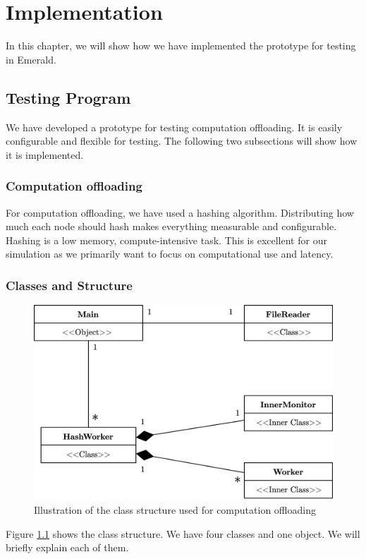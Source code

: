\chapter{Implementation}\label{chapter:implementation}


In this chapter, we will show how we have implemented the prototype for testing in Emerald.

\section{Testing Program}
We have developed a prototype for testing computation offloading. It is easily configurable and flexible for testing. The following two subsections will show how it is implemented.




\subsection{Computation offloading}
For computation offloading, we have used a hashing algorithm. Distributing how much each node should hash makes everything measurable and configurable. Hashing is a low memory, compute-intensive task. This is excellent for our simulation as we primarily want to focus on computational use and latency.





\subsection{Classes and Structure}
\begin{figure}[t]
    \centering
    \includegraphics[scale=0.9]{chapters/5_implementation/figures/HashWorker_class_diagram.png}
    \caption{Illustration of the class structure used for computation offloading}
    \label{fig:HashWorker_class_diagram}
\end{figure}
Figure \ref{fig:HashWorker_class_diagram} shows the class structure. We have four classes and one object. We will briefly explain each of them.


